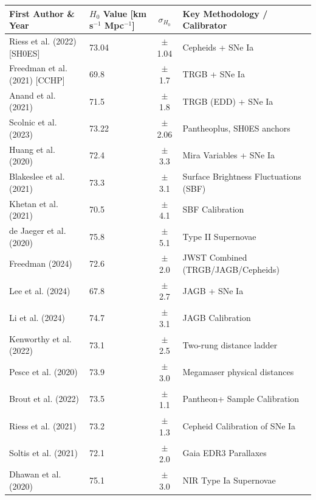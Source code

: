 \documentclass{book}
\begin{document}
	\begin{table}[h!]
		\centering
		\scriptsize
		\begin{tabular}{llcl}
			\hline\hline
			First Author \& Year & $H_0$ Value [km s$^{-1}$ Mpc$^{-1}$] & $\sigma_{H_0}$ & Key Methodology / Calibrator \\ 
			\hline
			Riess et al. (2022) [SH0ES]   & 73.04 & $\pm$ 1.04 & Cepheids + SNe Ia \\
			Freedman et al. (2021) [CCHP] & 69.8  & $\pm$ 1.7  & TRGB + SNe Ia \\
			Anand et al. (2021)           & 71.5  & $\pm$ 1.8  & TRGB (EDD) + SNe Ia \\
			Scolnic et al. (2023)         & 73.22 & $\pm$ 2.06 & Pantheoplus, SH0ES anchors \\
			Huang et al. (2020)           & 72.4  & $\pm$ 3.3  & Mira Variables + SNe Ia \\
			Blakeslee et al. (2021)       & 73.3  & $\pm$ 3.1  & Surface Brightness Fluctuations (SBF) \\
			Khetan et al. (2021)          & 70.5  & $\pm$ 4.1  & SBF Calibration \\
			de Jaeger et al. (2020)       & 75.8  & $\pm$ 5.1  & Type II Supernovae \\
			Freedman (2024)               & 72.6  & $\pm$ 2.0  & JWST Combined (TRGB/JAGB/Cepheids) \\
			Lee et al. (2024)             & 67.8  & $\pm$ 2.7  & JAGB + SNe Ia \\
			Li et al. (2024)              & 74.7  & $\pm$ 3.1  & JAGB Calibration \\
			Kenworthy et al. (2022)       & 73.1  & $\pm$ 2.5  & Two-rung distance ladder \\
			Pesce et al. (2020)           & 73.9  & $\pm$ 3.0  & Megamaser physical distances \\
			Brout et al. (2022)           & 73.5  & $\pm$ 1.1  & Pantheon+ Sample Calibration \\
			Riess et al. (2021)           & 73.2  & $\pm$ 1.3  & Cepheid Calibration of SNe Ia \\
			Soltis et al. (2021)          & 72.1  & $\pm$ 2.0  & Gaia EDR3 Parallaxes \\
			Dhawan et al. (2020)          & 75.1  & $\pm$ 3.0  & NIR Type Ia Supernovae \\

\end{tabular}
\end{table}
\end{document}
